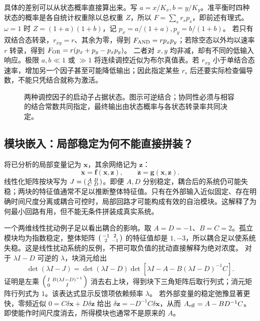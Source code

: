 \documentclass[11pt,a4paper,UTF8,fontset=fandol]{ctexart}
\begin{document}
具体的差别可以从状态概率直接算出来。写 $a=x/K_x,b=y/K_y$。准平衡时四种状态的概率是各自统计权重除以总权重 $Z$，所以 $F=\sum_s r_s p_s$，即前述有理式。$\omega=1$ 时 $Z=(1+a)(1+b)$，记 $p_x=a/(1+a),p_y=b/(1+b)$。
若只有双结合态转录，$r_{xy}=r$、其余为零，得到
$F_{\rm AND}=rp_xp_y$；若除空态以外均以速率 $r$ 转录，得到
$F_{\rm OR}=r(p_x+p_y-p_xp_y)$。
二者对 $x,y$ 均非减，却有不同的低输入响应。极限 $a,b\ll1$ 或 $\gg1$ 将连续调控近似为布尔真值表。若 $r_{xy}$ 小于单结合态速率，增加另一个因子甚至可能降低输出；因此指定某些 $r_s$ 后还要实际检查偏导数，不能只凭结合就称为激活。
\begin{figure}[H]\centering
{}
\caption{两种调控因子的启动子占据状态。图示可逆结合；协同性必须与相容的结合常数共同指定，最终输出由状态概率与各状态转录率共同决定。}
\end{figure}

\subsection{模块嵌入：局部稳定为何不能直接拼装？}
将已分析的局部变量记为 $\bm x$，其余网络记为 $\bm z$：
\begin{equation}\dot{\bm x}=\bm f(\bm x,\bm z),\qquad\dot{\bm z}=\bm g(\bm x,\bm z).\end{equation}
线性化矩阵按块写为 $J=\begin{psmallmatrix}A&B\\C&D\end{psmallmatrix}$。即便 $A,D$ 分别稳定，耦合后的系统仍可能失稳；两块的特征值通常不足以推断整体特征值。只有在外部输入近似固定、存在明确时间尺度分离或耦合可控时，局部回路才可能构成有效的自治模块。这解释了为何最小回路有用，但不能无条件拼装成真实系统。

一个两维线性扰动例子足以看出耦合的影响。取 $A=D=-1$、$B=C=2$。孤立模块均为指数稳定，整体矩阵
$\begin{psmallmatrix}-1&2\\2&-1\end{psmallmatrix}$ 的特征值却是 $1,-3$，所以耦合足以使系统失稳。这是线性扰动系统的反例，不把可取负值的扰动直接解释为绝对浓度。
对于 $\lambda I-D$ 可逆的 $\lambda$，块消元给出
\[
\det(\lambda I-J)=\det(\lambda I-D)
\det\left[\lambda I-A-B(\lambda I-D)^{-1}C\right].
\]
证明是左乘 $\begin{psmallmatrix}I&B(\lambda I-D)^{-1}\\0&I\end{psmallmatrix}$ 消去右上块，得到块下三角矩阵后取行列式；消元矩阵行列式为 $1$。该表达式显示反馈项依赖频率 $\lambda$。
若外部变量的稳定弛豫显著更快，零频近似 $0=C\delta\bm x+D\delta\bm z$ 给出 $\delta\bm z=-D^{-1}C\delta\bm x$，从而 $A_{\rm eff}=A-BD^{-1}C$。即使能作时间尺度消去，所得模块也通常不是原来的 $A$。
\end{document}
